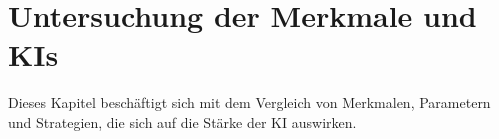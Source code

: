 
\chapter{Untersuchung der Merkmale und KIs}
\label{chap:merkmale}

Dieses Kapitel beschäftigt sich mit dem Vergleich von Merkmalen, Parametern und Strategien, die sich auf die Stärke der \ac{KI} auswirken.




